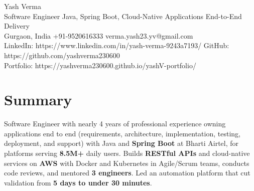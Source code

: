 \documentclass[letterpaper,10pt]{article}
\begin{document}
\begin{center}
  {\Huge Yash Verma} \\
  \small Software Engineer \textbar{} Java, Spring Boot, Cloud-Native Applications \textbar{} End-to-End Delivery \\
  \small Gurgaon, India \textbar{} +91-9520616333 \textbar{} verma.yash23.yv@gmail.com \\
  LinkedIn: https://www.linkedin.com/in/yash-verma-9243a7193/ \textbar{} GitHub: https://github.com/yashverma230600 \\
  Portfolio: https://yashverma230600.github.io/yashV-portfolio/
  \vspace{-8pt}
\end{center}

\section{Summary}
\begin{itemize}[leftmargin=0.15in, label={}]
  \small{\item{
    Software Engineer with nearly 4 years of professional experience owning applications end to end (requirements, architecture, implementation, testing, deployment, and support) with Java and \textbf{Spring Boot} at Bharti Airtel, for platforms serving \textbf{8.5M+} daily users. Builds \textbf{RESTful APIs} and cloud-native services on \textbf{AWS} with Docker and Kubernetes in Agile/Scrum teams, conducts code reviews, and mentored \textbf{3 engineers}. Led an automation platform that cut validation from \textbf{5 days to under 30 minutes}.
  }}
\end{itemize}
\vspace{-8pt}

\end{document}
